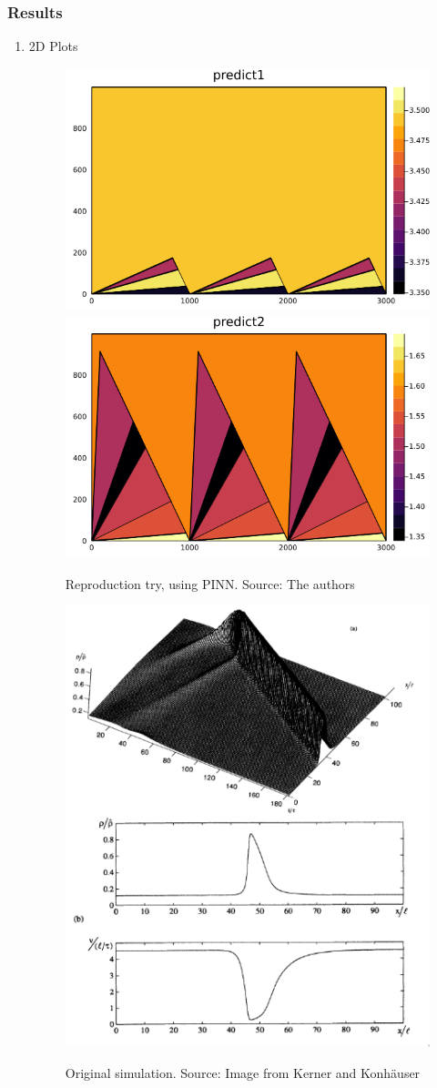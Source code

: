\documentclass[11pt]{article}
\begin{document}
\subsubsection{Results}
\label{sec:orge0274e4}
\begin{enumerate}
\item 2D Plots
\label{sec:org16394f4}

\begin{figure}[!htb]
  \centering
  \caption{\label{fig:sim1} Reproduction try, using PINN. Source: The authors}
  \includegraphics[width=0.45\linewidth]{Resources/img/sol_variable_corrected_bcs31.png}
  \includegraphics[width=0.45\linewidth]{Resources/img/sol_variable_corrected_bcs32.png}
  \\ %
\end{figure}
\clearpage

\begin{figure}[!htb]
  \centering
  \caption{\label{fig:sim2} Original simulation. Source: Image from Kerner and Konhäuser \cite{kerner1993}}
  \includegraphics[width=0.4\linewidth]{Resources/img/kerner.png}
  \\  %
\end{figure}


\end{enumerate}
\end{document}

